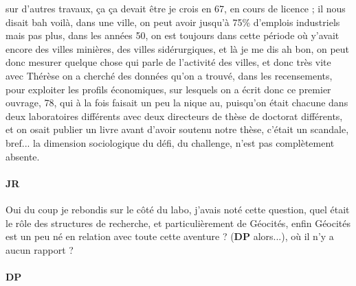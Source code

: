 \documentclass[12pt]{article}
\begin{document}
sur d'autres travaux, ça ça devait être je crois en 67, en cours de licence ; il nous disait bah voilà, dans une ville, on peut avoir jusqu'à 75\% d'emplois industriels mais pas plus, dans les années 50, on est toujours dans cette période %
où y'avait encore des villes minières, des villes sidérurgiques, et là je me dis ah bon, on peut donc mesurer quelque chose qui parle de l'activité des villes, et donc très vite avec Thérèse on a cherché des données qu'on a trouvé, dans les recensements, pour exploiter les profils économiques, sur lesquels on a écrit donc ce premier ouvrage, 78, qui à la fois faisait un peu la nique au, puisqu'on était chacune dans deux laboratoires différents avec deux directeurs de thèse de doctorat différents, et on osait publier un livre avant d'avoir soutenu notre thèse, c'était un scandale, bref... la dimension sociologique du défi, du challenge, n'est pas complètement absente.

\paragraph{JR}

Oui du coup je rebondis sur le côté du labo, j'avais noté cette question, quel était le rôle des structures de recherche, et particulièrement de Géocités, enfin Géocités est un peu né en relation avec toute cette aventure ? (\textbf{DP} alors...), où il n'y a aucun rapport ?

\paragraph{DP}
\end{document}
